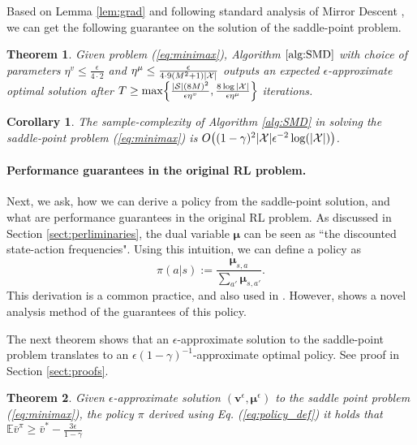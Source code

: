 \documentclass{article}
\newtheorem{corollary}{Corollary}
\newtheorem{theorem}{Theorem}
\DeclarePairedDelimiter\br{(}{)}%
\DeclarePairedDelimiter\brc{\{}{\}}%
\DeclarePairedDelimiter\abs{\lvert}{\rvert}%
\newcommand{\E}{\mathbb{E}}
\newcommand{\States}{\mathcal{S}}
\newcommand{\nSt}{{\abs{\States}}}
\newcommand{\nPairs}{{\abs{\mathcal{X}}}}
\newcommand{\vb}{\boldsymbol{v}}
\newcommand{\mub}{\boldsymbol{\mu}}
\newcommand{\vbar}{\bar{v}}
\newcommand{\vbe}{{\vb^\epsilon}}
\newcommand{\mube}{{\mub^\epsilon}}
\begin{document}
Based on Lemma \ref{lem:grad} and following standard analysis of Mirror Descent \citep{shalev2011online},  we can get the following guarantee on the solution of the saddle-point problem.

\begin{theorem} \label{thm:saddle_point}
Given problem (\ref{eq:minimax}),  Algorithm $\ref{alg:SMD}$ with choice of parameters $\eta^v \leq \frac{\epsilon}{4 \cdot 2}$ and $\eta^\mu \leq \frac{\epsilon}{4  \cdot  9(M^2+1)\nPairs}$ outputs an expected $\epsilon$-approximate optimal solution after  $T \geq \max \brc*{\frac{\nSt  (8 M)^2}{\epsilon \eta^v}, \frac{8 \log \nPairs}{\epsilon \eta^\mu}}$ iterations.
\end{theorem}


\begin{corollary}
    The sample-complexity of  Algorithm \ref{alg:SMD} in solving the saddle-point problem (\ref{eq:minimax}) is $O \br*{(1-\gamma)^2 \nPairs \epsilon^{-2} \log(\nPairs)}$.
\end{corollary}
    
    



\paragraph{Performance guarantees in the original RL problem.}
Next, we ask, how we can derive a policy from the saddle-point solution, and what are performance guarantees in the original RL problem.
As discussed in Section \ref{sect:perliminaries}, the dual variable $\mub$ can be seen as ``the discounted state-action frequencies".
Using this intuition, we can define a policy as 
\begin{equation} \label{eq:policy_def}
    \pi(a|s) := \frac{\mub_{s,a}}{\sum_{a'} \mub_{s,a'}}.
\end{equation}
This derivation is a common practice, and also used in \citet{cheng2020reduction}.
However, \citet{jin20efficiently} shows a novel analysis method of the guarantees of this policy.

The next theorem shows that an $\epsilon$-approximate solution to the saddle-point problem translates to an $\epsilon(1-\gamma)^{-1}$-approximate optimal policy. See proof in Section \ref{sect:proofs}.
\begin{theorem}
 \label{thm:pol_gurantee}
Given  $\epsilon$-approximate solution $(\vbe,\mube)$ to the saddle point problem (\ref{eq:minimax}), the policy $\pi$ derived using Eq. (\ref{eq:policy_def}) it holds that $\E \vbar^{\pi}\geq \vbar^* - \frac{3 \epsilon}{1-\gamma} $
\end{theorem}
\end{document}
